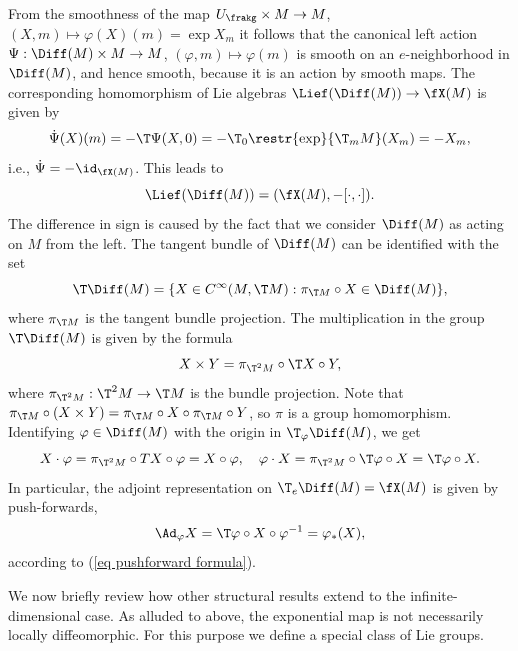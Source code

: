 \begin{example}
    From the smoothness of the map $U_\frakg\times M\to M$, $(X,m)\mapsto \varphi(X)(m)=\exp X_m$ it follows that the canonical left action $\Psi:\Diff(M)\times M\to M$, $(\varphi,m)\mapsto \varphi(m)$ is smooth on an $e$-neighborhood in $\Diff(M)$, and hence smooth, because it is an action by smooth maps. The corresponding homomorphism of Lie algebras $\Lief(\Diff(M))\to \fX(M)$ is given by
    \[\dot\Psi(X)(m)=-\T\Psi (X,0)=-\T_{0}\restr{\exp}{\T_m M}(X_m)=-X_m,\]
    i.e., $\dot\Psi=-\id_{\fX(M)}$. This leads to
    \[\Lief (\Diff(M))=(\fX(M),-[\cdot,\cdot]).\]
    The difference in sign is caused by the fact that we consider $\Diff(M)$ as acting on $M$ from the left. The tangent bundle of $\Diff(M)$ can be identified with the set
    \[\T\Diff(M)=\{X\in C^\infty(M,\T M):\pi_{\T M}\circ X\in \Diff(M)\},\]
    where $\pi_{\T M}$ is the tangent bundle projection. The multiplication in the group $\T\Diff(M)$ is given by the formula
    \[X\times Y=\pi_{\T^2M}\circ \T X\circ Y,\]
    where $\pi_{\T^2M}:\T^2M\to \T M$ is the bundle projection. Note that $\pi_{\T M}\circ (X\times Y)=\pi_{\T M}\circ X\circ \pi_{\T M}\circ Y$, so $\pi$ is a group homomorphism. Identifying $\varphi\in\Diff(M)$ with the origin in $\T_\varphi\Diff(M)$, we get 
    \[X\cdot \varphi=\pi_{\T^2M}\circ TX\circ \varphi=X\circ \varphi,\quad \varphi\cdot X=\pi_{\T^2M}\circ \T\varphi\circ X=\T\varphi\circ X.\]
    In particular, the adjoint representation on $\T_e\Diff(M)=\fX(M)$ is given by push-forwards,
    \[\Ad_\varphi X=\T\varphi\circ X\circ \varphi^{-1}=\varphi_\ast (X),\]
    according to (\ref{eq pushforward formula}).
\end{example}


We now briefly review how other structural results extend to the infinite-dimensional case. As alluded to above, the exponential map is not necessarily locally diffeomorphic. For this purpose we define a special class of Lie groups.

